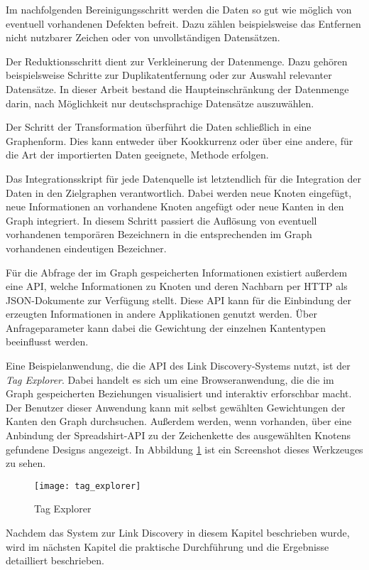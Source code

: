 Im nachfolgenden Bereinigungsschritt werden die Daten so gut wie möglich von eventuell vorhandenen Defekten befreit. Dazu zählen beispielsweise das Entfernen nicht nutzbarer Zeichen oder von unvollständigen Datensätzen.

Der Reduktionsschritt dient zur Verkleinerung der Datenmenge. Dazu gehören beispielsweise Schritte zur Duplikatentfernung oder zur Auswahl relevanter Datensätze. In dieser Arbeit bestand die Haupteinschränkung der Datenmenge darin, nach Möglichkeit nur deutschsprachige Datensätze auszuwählen.

Der Schritt der Transformation überführt die Daten schließlich in eine Graphenform. Dies kann entweder über Kookkurrenz oder über eine andere, für die Art der importierten Daten geeignete, Methode erfolgen.

Das Integrationsskript für jede Datenquelle ist letztendlich für die Integration der Daten in den Zielgraphen verantwortlich. Dabei werden neue Knoten eingefügt, neue Informationen an vorhandene Knoten angefügt oder neue Kanten in den Graph integriert. In diesem Schritt passiert die Auflösung von eventuell vorhandenen temporären Bezeichnern in die entsprechenden im Graph vorhandenen eindeutigen Bezeichner.

Für die Abfrage der im Graph gespeicherten Informationen existiert außerdem eine API, welche Informationen zu Knoten und deren Nachbarn per HTTP als JSON-Dokumente zur Verfügung stellt. Diese API kann für die Einbindung der erzeugten Informationen in andere Applikationen genutzt werden. Über Anfrageparameter kann dabei die Gewichtung der einzelnen Kantentypen beeinflusst werden.

Eine Beispielanwendung, die die API des Link Discovery-Systems nutzt, ist der \emph{Tag Explorer}. Dabei handelt es sich um eine Browseranwendung, die die im Graph gespeicherten Beziehungen visualisiert und interaktiv erforschbar macht. Der Benutzer dieser Anwendung kann mit selbst gewählten Gewichtungen der Kanten den Graph durchsuchen. Außerdem werden, wenn vorhanden, über eine Anbindung der Spreadshirt-API zu der Zeichenkette des ausgewählten Knotens gefundene Designs angezeigt. In Abbildung \ref{fig:tag_explorer} ist ein Screenshot dieses Werkzeuges zu sehen.

\begin{figure}
\centering
\texttt{[image: tag\_explorer]}
\caption{Tag Explorer}
\label{fig:tag_explorer}
\end{figure}

Nachdem das System zur Link Discovery in diesem Kapitel beschrieben wurde, wird im nächsten Kapitel die praktische Durchführung und die Ergebnisse detailliert beschrieben.